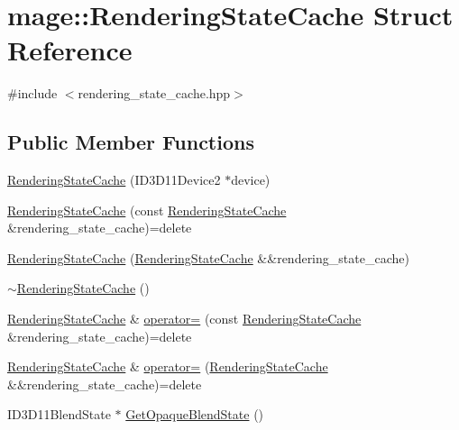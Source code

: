 \hypertarget{structmage_1_1_rendering_state_cache}{}\section{mage\+:\+:Rendering\+State\+Cache Struct Reference}
\label{structmage_1_1_rendering_state_cache}


{\ttfamily \#include $<$rendering\+\_\+state\+\_\+cache.\+hpp$>$}

\subsection*{Public Member Functions}
\begin{DoxyCompactItemize}
\item 
\hyperlink{structmage_1_1_rendering_state_cache_ad818eaa6c950c5851d6e684b9a4b3a65}{Rendering\+State\+Cache} (I\+D3\+D11\+Device2 $\ast$device)
\item 
\hyperlink{structmage_1_1_rendering_state_cache_a47c0f5527ce10ca9b6a059946efda239}{Rendering\+State\+Cache} (const \hyperlink{structmage_1_1_rendering_state_cache}{Rendering\+State\+Cache} \&rendering\+\_\+state\+\_\+cache)=delete
\item 
\hyperlink{structmage_1_1_rendering_state_cache_aacdb082df6180f0fe6a76f54b7b2f776}{Rendering\+State\+Cache} (\hyperlink{structmage_1_1_rendering_state_cache}{Rendering\+State\+Cache} \&\&rendering\+\_\+state\+\_\+cache)
\item 
\hyperlink{structmage_1_1_rendering_state_cache_ac727351db3d929df122327887edc3668}{$\sim$\+Rendering\+State\+Cache} ()
\item 
\hyperlink{structmage_1_1_rendering_state_cache}{Rendering\+State\+Cache} \& \hyperlink{structmage_1_1_rendering_state_cache_a9534ceabde1d3f9f318f90d2ceec7646}{operator=} (const \hyperlink{structmage_1_1_rendering_state_cache}{Rendering\+State\+Cache} \&rendering\+\_\+state\+\_\+cache)=delete
\item 
\hyperlink{structmage_1_1_rendering_state_cache}{Rendering\+State\+Cache} \& \hyperlink{structmage_1_1_rendering_state_cache_aac885d9a83e196299ac896b3847f471b}{operator=} (\hyperlink{structmage_1_1_rendering_state_cache}{Rendering\+State\+Cache} \&\&rendering\+\_\+state\+\_\+cache)=delete
\item 
I\+D3\+D11\+Blend\+State $\ast$ \hyperlink{structmage_1_1_rendering_state_cache_a7208ccd74aa075e5283ad91d0efdf455}{Get\+Opaque\+Blend\+State} ()
\item 

\end{DoxyCompactItemize}
